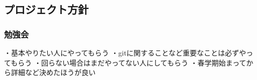 \subsection*{プロジェクト方針}


\subsubsection*{勉強会}
・基本やりたい人にやってもらう
・gitに関することなど重要なことは必ずやってもらう
・回らない場合はまだやってない人にしてもらう
・春学期始まってから詳細など決めたほうが良い

